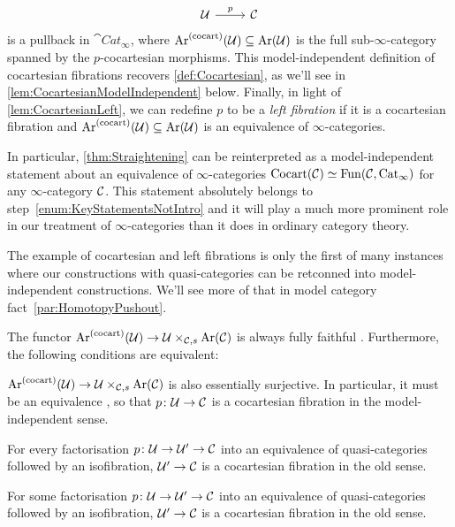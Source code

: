 \begin{numpar}
\begin{equation*}
\begin{tikzcd}
			\Uu\rar["p"] & \Cc
		\end{tikzcd}
	\end{equation*}
	is a pullback in $\cat{Cat}_\infty$, where $\operatorname{Ar}^{(\mathrm{cocart})}(\mathcal{U})\subseteq \operatorname{Ar}(\mathcal{U})$ is the full sub-$\infty$-category spanned by the $p$-cocartesian morphisms. This model-independent definition of cocartesian fibrations recovers \cref{def:Cocartesian}, as we'll see in \cref{lem:CocartesianModelIndependent} below. Finally, in light of \cref{lem:CocartesianLeft}, we can redefine $p$ to be a \emph{left fibration} if it is a cocartesian fibration and $\operatorname{Ar}^{(\mathrm{cocart})}(\mathcal{U})\subseteq \operatorname{Ar}(\mathcal{U})$ is an equivalence of $\infty$-categories.
	
	
	In particular, \cref{thm:Straightening} can be reinterpreted as a model-independent statement about an equivalence of $\infty$-categories $\mathrm{Cocart}(\mathcal{C})\simeq \operatorname{Fun}(\mathcal{C},\mathrm{Cat}_\infty)$ for any $\infty$-category $\mathcal{C}$. This statement absolutely belongs to step~\cref{enum:KeyStatementsNotIntro} and it will play a much more prominent role in our treatment of $\infty$-categories than it does in ordinary category theory.
	
	The example of cocartesian and left fibrations is only the first of many instances where our constructions with quasi-categories can be retconned into model-independent constructions. We'll see more of that in model category fact~\cref{par:HomotopyPushout}.
\end{numpar}
\begin{lem}\label{lem:CocartesianModelIndependent}
	The functor $\operatorname{Ar}^{(\mathrm{cocart})}(\mathcal{U})\rightarrow \mathcal{U}\times_{\mathcal{C},s}\operatorname{Ar}(\mathcal{C})$ is always fully faithful . Furthermore, the following conditions are equivalent:
	\begin{alphanumerate}
		\item $\operatorname{Ar}^{(\mathrm{cocart})}(\mathcal{U})\rightarrow \mathcal{U}\times_{\mathcal{C},s}\operatorname{Ar}(\mathcal{C})$ is also essentially surjective. In particular, it must be an equivalence , so that $p\colon \mathcal{U}\rightarrow \mathcal{C}$ is a cocartesian fibration in the model-independent sense.\label{enum:CocartesianModelIndependent}
		\item For every factorisation $p\colon \mathcal{U}\rightarrow \mathcal{U}'\rightarrow \mathcal{C}$ into an equivalence of quasi-categories followed by an isofibration, $\mathcal{U}'\rightarrow \mathcal{C}$ is a cocartesian fibration in the old sense.\label{enum:CocartesianAllFactorisations}
		\item For some factorisation $p\colon \mathcal{U}\rightarrow \mathcal{U}'\rightarrow \mathcal{C}$ into an equivalence of quasi-categories followed by an isofibration, $\mathcal{U}'\rightarrow \mathcal{C}$ is a cocartesian fibration in the old sense.\label{enum:CocartesianSomeFactorisations}
	\end{alphanumerate}
\end{lem}
